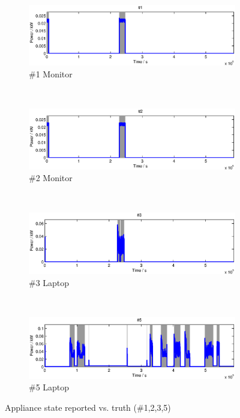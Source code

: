 \begin{figure}[p]
    \centering
    \begin{subfigure}[t]{0.8\textwidth}
        \centering
        \includegraphics[width=\textwidth] {../../sw/pc/matlab/disagg-result/state-1.eps}
        \caption{\#1 Monitor}
    \end{subfigure} 
    \\
    \begin{subfigure}[t]{0.8\textwidth}
        \centering
        \includegraphics[width=\textwidth] {../../sw/pc/matlab/disagg-result/state-2.eps}
        \caption{\#2 Monitor}
    \end{subfigure}
    \\
    \begin{subfigure}[t]{0.8\textwidth}
        \centering
        \includegraphics[width=\textwidth] {../../sw/pc/matlab/disagg-result/state-3.eps}
        \caption{\#3 Laptop}
    \end{subfigure}
    \\
    \begin{subfigure}[t]{0.8\textwidth}
        \centering
        \includegraphics[width=\textwidth] {../../sw/pc/matlab/disagg-result/state-5.eps}
        \caption{\#5 Laptop}
    \end{subfigure}
    \caption{Appliance state reported vs. truth (\#1,2,3,5)}\label{fig:state-1-2-3-5}
\end{figure}

